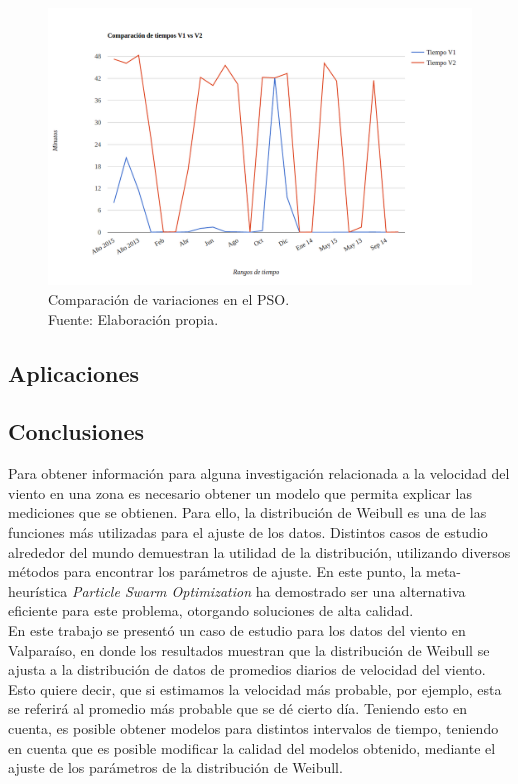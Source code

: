 \begin{figure}[ht!]
    \begin{center}
        \includegraphics[width=\textwidth]{figures/comp_v1_v2_tiempo.png}
    \end{center}    
    \caption{Comparación de variaciones en el PSO.\\ Fuente: Elaboración propia.}
    \label{fig:comparison_pso_2}
\end{figure}

\pagebreak
\subsection{Aplicaciones}

\pagebreak
\subsection{Conclusiones}
Para obtener información para alguna investigación relacionada a la velocidad del viento en una zona es necesario obtener un modelo que permita explicar las mediciones que se obtienen. Para ello, la distribución de Weibull es una de las funciones más utilizadas para el ajuste de los datos.
Distintos casos de estudio alrededor del mundo demuestran la utilidad de la distribución, utilizando diversos métodos para encontrar los parámetros de ajuste.
En este punto, la meta-heurística \emph{Particle Swarm Optimization} ha demostrado ser una alternativa eficiente para este problema, otorgando soluciones 
de alta calidad.\\
En este trabajo se presentó un caso de estudio para los datos del viento en Valparaíso, en donde los resultados muestran que la distribución de Weibull
se ajusta a la distribución de datos de promedios diarios de velocidad del viento. Esto quiere decir, que si estimamos la velocidad más probable, por ejemplo, 
esta se referirá al promedio más probable que se dé cierto día. Teniendo esto en cuenta, es posible obtener modelos para distintos intervalos de tiempo,
teniendo en cuenta que es posible modificar la calidad del modelos obtenido, mediante el ajuste de los parámetros de la distribución de Weibull.